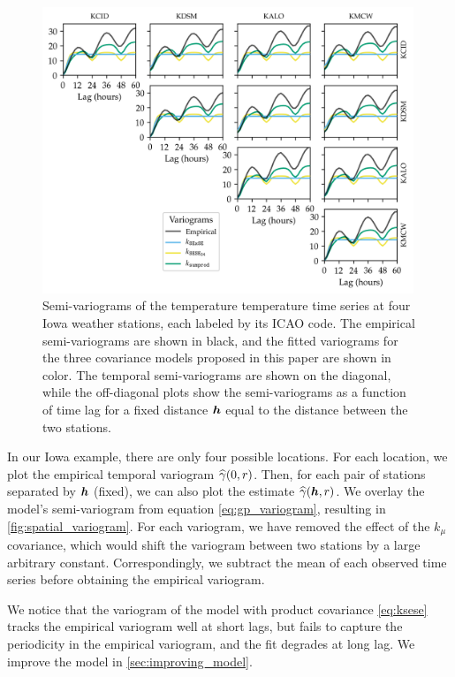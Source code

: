 \documentclass[12pt]{article}
\begin{document}
\begin{figure}[!tbp]
\centering
\includegraphics[width=0.99\textwidth]{../figures/spatial_variogram.png}
\caption{\label{fig:spatial_variogram}
Semi-variograms of the temperature temperature time series at four Iowa weather stations, each labeled by its ICAO code.
The empirical semi-variograms are shown in black, and the fitted variograms for the three covariance models proposed in this paper are shown in color.
The temporal semi-variograms are shown on the diagonal, while the off-diagonal plots show the semi-variograms as a function of time lag for a fixed distance \(\bm{h}\) equal to the distance between the two stations.
}
\end{figure}

In our Iowa example, there are only four possible locations. For each location, we plot the empirical temporal variogram \(\widehat\gamma\del{0,r}\). Then, for each pair of stations separated by \(\bm{h}\) (fixed), we can also plot the estimate \(\widehat\gamma\del{\hvec,r}\). 
We overlay the model's semi-variogram from equation \autoref{eq:gp_variogram}, resulting in \autoref{fig:spatial_variogram}.
For each variogram, we have removed the effect of the \(k_\mu\) covariance, which would shift the variogram between two stations by a large arbitrary constant.
Correspondingly, we subtract the mean of each observed time series before obtaining the empirical variogram.

We notice that the variogram of the model with product covariance \autoref{eq:ksese} tracks the empirical variogram well at short lags, but fails to capture the periodicity in the empirical variogram, and the fit degrades at long lag. We improve the model in \autoref{sec:improving_model}.
\end{document}
